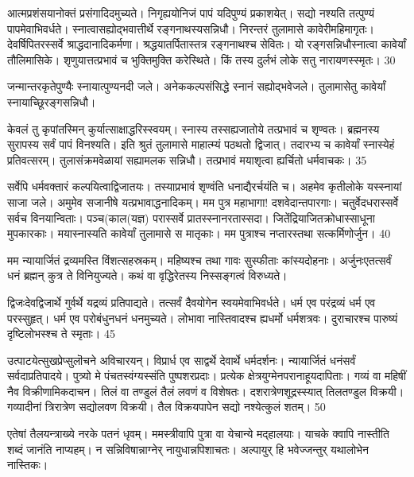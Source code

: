   आत्मप्रशंसयानोक्तं प्रसंगादिदमुच्यते।
 निगृह्ययोनिजं पापं यदिपुण्यं प्रकाशयेत्।
 सद्यो नश्यति तत्पुण्यं पापमेवाभिवर्धते।
 स्नात्वासह्योद्भवात्तीर्थे रङ्गनाथस्यसन्निधौ।
 निरन्तरं तुलामासे कावेरीमहिमागृतः।
 देवर्षिपितरस्सर्वे श्राद्धदानादिकर्मणा।
 श्रद्धयातर्पितास्तत्र रङ्गनाथश्च सेवितः।
 यो रङ्गसन्निधौस्नात्वा कावेर्यां तौलिमासिके।
 शृणुयात्तत्प्रभावं च भुक्तिमुक्ति करेस्थिते।
 किं तस्य दुर्लभं लोके सतु नारायणस्स्मृतः।
 30

  जन्मान्तरकृतेपुण्यैः स्नायात्पुण्यनदी जले।
 अनेककल्पसंसिद्धे स्नानं सह्योद्भवेजले।
 तुलामासेतु कावेर्यां स्नायाच्छूिरङ्गसन्निधौ।
 
केवलं तु कृपांतस्मिन् कुर्यात्साक्षाद्धरिस्स्वयम्।
 स्नास्य तस्सह्यजातोये तत्प्रभावं च शृण्वतः।
 ब्रह्मनस्य सुरापस्य सर्वं पापं विनश्यति।
 इति श्रुतं तुलामासे माहात्म्यं पठथतो द्विजात्।
 तदारभ्य च कावेर्यां स्नास्येहं प्रतिवत्सरम्।
 तुलासंक्रमवेळायां सह्यामलक सन्निधौ।
 तत्प्रभावं मयाशृत्वा ह्यर्चितो धर्मवाचकः।
 35

  सर्वेपि धर्मवक्तारं कल्पयित्वाद्विजातयः।
 तस्याप्रभावं शृण्वंति धनाद्यैरर्चयंति च।
 अहमेव कृतीलोके यस्स्नायां साजा जले।
 अमुमेव सजानीषे यत्प्रभावाद्धनादिकम्।
 मम पुत्र महाभागा! दशवेदान्तपारगाः।
 चतुर्वेदधरास्सर्वे सर्वच विनयान्विताः।
 पञ्च(काल(यज्ञ) परास्सर्वे प्रातस्स्नानरतास्सदा।
 जितेंद्रियाजितक्रोधास्साधूना मुपकारकाः।
 मयास्नास्यति कावेर्यां तुलामासे स मातृकाः।
 मम पुत्राश्च नप्तारस्तथा सत्कर्मिणोर्जुन।
 40

  मम न्यायार्जितं द्रव्यमस्ति विंशत्सहस्रकम्।
 महिष्यश्च तथा गावः सुस्फीताः कांस्यदोहनाः।
 अर्जुनःएतत्सर्वं धनं ब्रह्मन् कुत्र ते विनियुज्यते।
 कथं वा वृद्धिरेतस्य निस्सङ्गत्वं विरुध्यते।
 
द्विजःदेवद्विजार्थे गुर्वर्थे यद्रव्यं प्रतिपाद्यते।
 तत्सर्वं दैवयोगेन स्वयमेवाभिवर्धते।
 धर्म एव परंद्रव्यं धर्म एव परस्सुहृत्।
 धर्म एव परोबंधुनधनं धनमुच्यते।
 लोभावा नास्तिवादश्च ह्यधर्मो धर्मशत्रवः।
 दुराचारश्च पारुष्यं दृष्टिलोभस्श्च ते स्मृताः।
 45

  उत्पाटयेत्सुखप्रेप्सुलॊचने अविचारयन्।
 विप्रार्ध एव साद्वर्थे देवार्थे धर्मदर्शनः।
 न्यायार्जितं धनंसर्वं सर्वदाप्रतिपादये।
 पुत्र्यो मे पंचतस्वंग्यस्संति पुष्पशरप्रदाः।
 प्रत्येक क्षेत्रयुग्मेनपरानाहूयदापिताः।
 गव्यं वा महिषीं नैव विक्रीणामिकदाचन।
 तिलं वा तण्डुलं तैलं लवणं व विशेषतः।
 दशरात्रेणशूद्रस्स्यात् तिलतण्डुल विक्रयी।
 गव्यादीनां त्रिरात्रेण सद्योलवण विक्रयी।
 तैल विक्रयपापेन सद्यो नश्येत्कुलं शतम्।
 50

  एतेषां तैलयन्त्राख्ये नरके पतनं धृवम्।
 ममस्त्रीवापि पुत्रा वा येचान्ये मद्हालयाः।
 याचके क्वापि नास्तीति शब्दं जानंति नाप्यहम्।
 न सन्निविषान्नाग्नेर् नायुधान्नपिशाचतः।
 अल्पायुर् हि भवेज्जन्तुर् यथालोभेन नास्तिकः।
 

